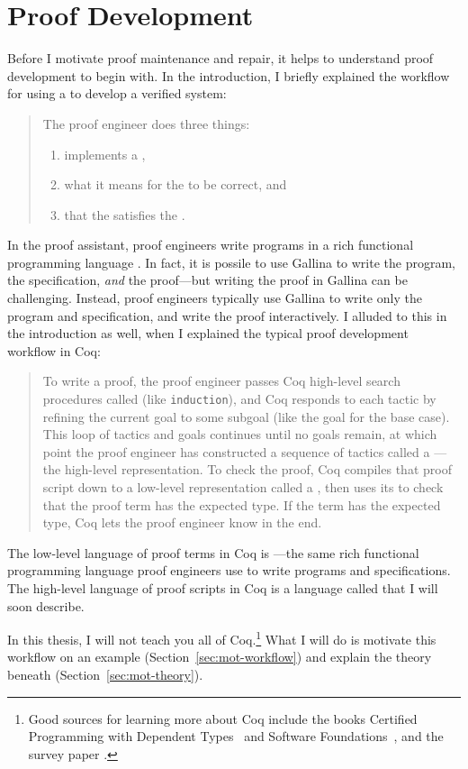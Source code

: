 \section{Proof Development}
\label{sec:mot-dev}

Before I motivate proof maintenance and repair, it helps to understand proof development to begin with.
In the introduction, I briefly explained the workflow for using a  to develop a verified system:

\begin{quote}
The proof engineer does three things:

\begin{enumerate}
\item implements a ,
\item {} what it means for the  to be correct, and
\item {} that the  satisfies the .
\end{enumerate}
\end{quote}
In the  proof assistant, proof engineers write programs in a rich functional programming language .
In fact, it is possile to use Gallina to write the program, the specification, \textit{and} the proof---but writing the proof in Gallina can be challenging.
Instead, proof engineers typically use Gallina to write only the program and specification,
and write the proof interactively.
I alluded to this in the introduction as well, when I explained the typical proof development workflow in Coq:

\begin{quote}
To write a proof, the proof engineer passes Coq high-level search procedures called  (like \lstinline{induction}), and Coq responds to each tactic
by refining the current goal to some subgoal (like the goal for the base case). This loop of tactics and goals 
continues until no goals remain, at which point the proof engineer has constructed a sequence of tactics called a ---the
high-level representation.
To check the proof, Coq compiles that proof script down to a low-level representation called a ,
then uses its  to check that the proof term has the expected type.
If the term has the expected type, Coq lets the proof engineer know in the end.
\end{quote}
The low-level language of proof terms in Coq is ---the same rich functional programming language proof engineers use to write programs and specifications.
The high-level language of proof scripts in Coq is a language called  that I will soon describe.

In this thesis, I will not teach you all of Coq.\footnote{Good sources 
for learning more about Coq include the books Certified Programming with Dependent Types~\cite{chlipala:cpdt}
and Software Foundations~\cite{software-foundations}, and the survey paper .}
What I will do is motivate this workflow on an example (Section~\ref{sec:mot-workflow})
and explain the theory beneath (Section~\ref{sec:mot-theory}).





